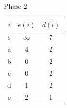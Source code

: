 \documentclass[hyperref={},
xcolor={dvipsnames,svgnames,table},10pt]{beamer}
\begin{document}
\begin{frame}{Phase 2}
\begin{minipage}[c]{0.3\linewidth}
	\end{minipage}\hfill 
	\begin{minipage}[c]{0.3\linewidth}
		\begin{tabular}{|c|c|c|}
			\hline
			$i$ & $e(i)$ & $d(i)$ \\ \hline
			s & $\infty$ & 7 \\ \hline
			a &  4 & 2 \\ \hline
			b &  0 & 2 \\ \hline
			c &  0 & 2 \\ \hline
			d &  1 & 2 \\ \hline
			e &  2 & 1 \\ \hline
		\end{tabular}
	\end{minipage}
\end{frame}
\end{document}
